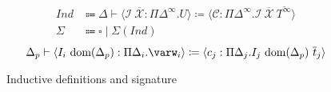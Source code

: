 \begin{figure}
\centering
\begin{align*}
\textit{Ind} &\Coloneqq \Delta \vdash \langle \mathcal{I}\ \overline{\mathcal{X}}: \Pi\Delta^\infty. U \rangle \coloneqq \langle \mathcal{C}: \Pi\Delta^\infty. \mathcal{I}\ \overline{\mathcal{X}}\ \overline{T^\infty} \rangle \\
\Sigma &\Coloneqq \square \mid \Sigma (\textit{Ind})
\end{align*}
\begin{equation*}
\Delta_p \vdash \langle I_i\ \dom{\Delta_p}: \Pi\Delta_i. \varw_i \rangle \coloneqq \langle c_j: \Pi\Delta_j. I_j\ \dom{\Delta_p}\ \overline{t}_j \rangle
\end{equation*}
\caption{Inductive definitions and signature}
\label{fig:inductives}
\end{figure}